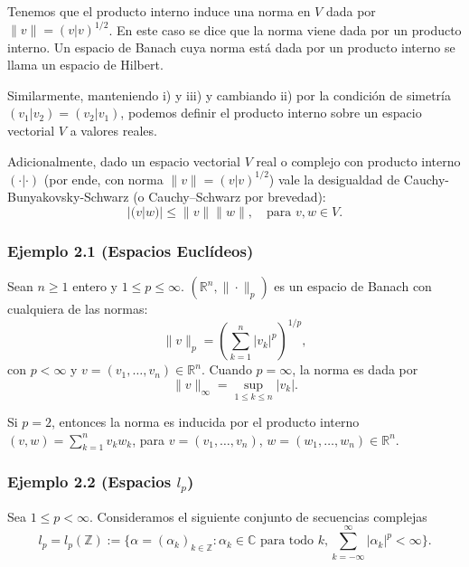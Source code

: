 Tenemos que el producto interno induce una norma en \( V \) dada por \( \| v \| = ( v | v )^{1/2} \). En este caso se dice que la norma viene dada por un producto interno. Un espacio de Banach cuya norma está dada por un producto interno se llama un espacio de Hilbert.

Similarmente, manteniendo i) y iii) y cambiando ii) por la condición de simetría \( (v_1 | v_2) = (v_2 | v_1) \), podemos definir el producto interno sobre un espacio vectorial \( V \) a valores reales.

Adicionalmente, dado un espacio vectorial \( V \) real o complejo con producto interno \( ( \cdot | \cdot ) \) (por ende, con norma \( \| v \| = ( v | v )^{1/2} \)) vale la desigualdad de Cauchy-Bunyakovsky-Schwarz (o Cauchy–Schwarz por brevedad):
\[
|( v | w )| \leq \| v \| \| w \|, \quad \text{para } v, w \in V.
\]

\subsubsection{Ejemplo 2.1 (Espacios Euclídeos)}
Sean \( n \geq 1 \) entero y \( 1 \leq p \leq \infty \). \( ( \mathbb{R}^n, \| \cdot \|_p ) \) es un espacio de Banach con cualquiera de las normas:
\[
\| v \|_p = \left( \sum_{k=1}^n | v_k |^p \right)^{1/p},
\]
con \( p < \infty \) y \( v = (v_1, \ldots, v_n) \in \mathbb{R}^n \). Cuando \( p = \infty \), la norma es dada por
\[
\| v \|_\infty = \sup_{1 \leq k \leq n} | v_k |.
\]

Si \( p = 2 \), entonces la norma es inducida por el producto interno \( (v, w) = \sum_{k=1}^n v_k w_k \), para \( v = (v_1, \ldots, v_n) \), \( w = (w_1, \ldots, w_n) \in \mathbb{R}^n \).

\subsubsection{Ejemplo 2.2 (Espacios \( l_p \))}
Sea \( 1 \leq p < \infty \). Consideramos el siguiente conjunto de secuencias complejas
\[
l_p = l_p(\mathbb{Z}) := \{ \alpha = (\alpha_k)_{k \in \mathbb{Z}} : \alpha_k \in \mathbb{C} \text{ para todo } k, \sum_{k=-\infty}^{\infty} |\alpha_k|^p < \infty \}.
\]


\